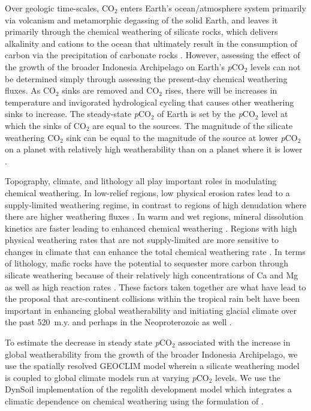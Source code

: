 \documentclass[11pt,letterpaper]{article}
\newcommand{\pCOtwo}{\textit{p}CO$_{2}$\xspace}
\newcommand{\COtwo}{CO$_{2}$\xspace}
\begin{document}
Over geologic time-scales, \COtwo enters Earth's ocean/atmosphere system primarily via volcanism and metamorphic degassing of the solid Earth, and leaves it primarily through the chemical weathering of silicate rocks, which delivers alkalinity and cations to the ocean that ultimately result in the consumption of carbon via the precipitation of carbonate rocks \citep{Kump2000a}. However, assessing the effect of the growth of the broader Indonesia Archipelago on Earth's \pCOtwo levels can not be determined simply through assessing the present-day chemical weathering fluxes. As \COtwo sinks are removed and \COtwo rises, there will be increases in temperature and invigorated hydrological cycling that causes other weathering sinks to increase. The steady-state \pCOtwo of Earth is set by the \pCOtwo level at which the sinks of \COtwo are equal to the sources. The magnitude of the silicate weathering \COtwo sink can be equal to the magnitude of the source at lower \pCOtwo on a planet with relatively high weatherability than on a planet where it is lower \citep{Kump1997a}.

Topography, climate, and lithology all play important roles in modulating chemical weathering. In low-relief regions, low physical erosion rates lead to a supply-limited weathering regime, in contrast to regions of high denudation where there are higher weathering fluxes \citep{Gabet2009a, West2012a, Maher2014a}. In warm and wet regions, mineral dissolution kinetics are faster leading to enhanced chemical weathering \citep{Lasaga1994a, West2012a}. Regions with high physical weathering rates that are not supply-limited are more sensitive to changes in climate that can enhance the total chemical weathering rate \citep{West2012a, Maher2014a}. In terms of lithology, mafic rocks have the potential to sequester more carbon through silicate weathering because of their relatively high concentrations of Ca and Mg as well as high reaction rates \citep{Dessert2003a}. These factors taken together are what have lead to the proposal that arc-continent collisions within the tropical rain belt have been important in enhancing global weatherability and initiating glacial climate over the past 520~m.y. \citep{Jagoutz2016a, Swanson-Hysell2017a, Macdonald2019a} and perhaps in the Neoproterozoic as well \citep{Park2019a}.

To estimate the decrease in steady state \pCOtwo associated with the increase in global weatherability from the growth of the broader Indonesia Archipelago, we use the spatially resolved GEOCLIM model \citep{Godderis2014a, Godderis2017c} wherein a silicate weathering model is coupled to global climate models run at varying \pCOtwo levels. We use the DynSoil implementation of the \citet{Gabet2009a} regolith development model which integrates a climatic dependence on chemical weathering using the formulation of \cite{West2012a}.
\end{document}
